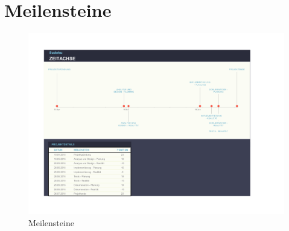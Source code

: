 \chapter{Meilensteine}

\begin{figure}[!htbp]
  \centering
     \includegraphics[keepaspectratio=true,
     scale=0.65,angle={90}]{Graphics/Meilensteine.pdf}
  \caption{Meilensteine}
  \label{fig:meilensteine}
\end{figure}
